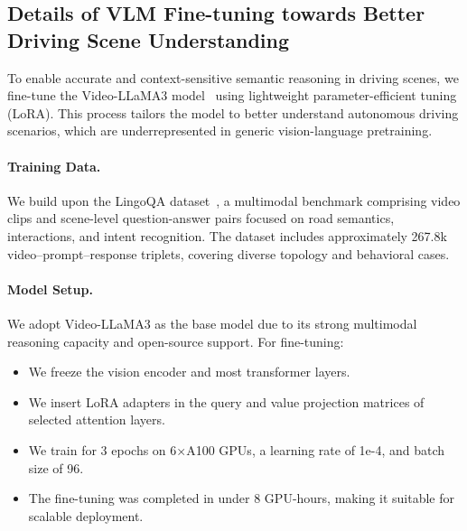 \documentclass{article}
\begin{document}
\subsection{Details of VLM Fine-tuning towards Better Driving Scene Understanding}
To enable accurate and context-sensitive semantic reasoning in driving scenes, we fine-tune the Video-LLaMA3 model~\cite{zhang2025videollama} using lightweight parameter-efficient tuning (LoRA). This process tailors the model to better understand autonomous driving scenarios, which are underrepresented in generic vision-language pretraining.

\paragraph{Training Data.}
We build upon the LingoQA dataset~\cite{marcu2024lingoqa}, a multimodal benchmark comprising video clips and scene-level question-answer pairs focused on road semantics, interactions, and intent recognition. The dataset includes approximately 267.8k video–prompt–response triplets, covering diverse topology and behavioral cases.

\paragraph{Model Setup.}
We adopt Video-LLaMA3 as the base model due to its strong multimodal reasoning capacity and open-source support. For fine-tuning:
\begin{itemize}[leftmargin=1em, topsep=0pt, itemsep=0.3em]
    \item We freeze the vision encoder and most transformer layers.
    \item We insert LoRA adapters in the query and value projection matrices of selected attention layers.
    \item We train for 3 epochs on 6×A100 GPUs, a learning rate of 1e-4, and batch size of 96.
    \item The fine-tuning was completed in under 8 GPU-hours, making it suitable for scalable deployment.
\end{itemize}
\end{document}
